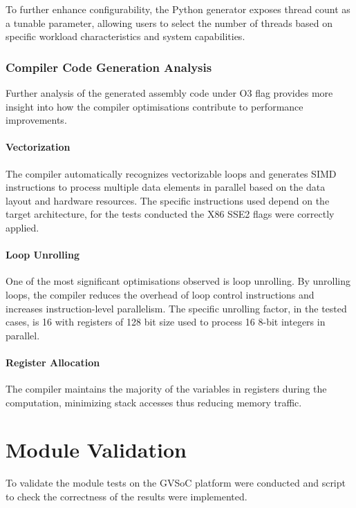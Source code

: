 To further enhance configurability, the Python generator exposes thread count as a tunable parameter, 
allowing users to select the number of threads based on specific workload characteristics and system capabilities.

\subsubsection{Compiler Code Generation Analysis}\label{sec:codegen_analysis}

Further analysis of the generated assembly code under O3 flag provides more insight into how the compiler optimisations contribute to performance improvements.

\paragraph{Vectorization} The compiler automatically recognizes vectorizable loops and generates SIMD instructions to process multiple data elements in parallel based on the data layout and hardware resources.
The specific instructions used depend on the target architecture, for the tests conducted the X86 SSE2 flags were correctly applied.

\paragraph{Loop Unrolling} One of the most significant optimisations observed is loop unrolling.
By unrolling loops, the compiler reduces the overhead of loop control instructions and increases instruction-level parallelism.
The specific unrolling factor, in the tested cases, is 16 with registers of 128 bit size used to process 16 8-bit integers in parallel.
\paragraph{Register Allocation} The compiler maintains the majority of the variables in registers during the computation, minimizing stack accesses thus reducing memory traffic.


\section{Module Validation}\label{sec:mod_val}
To validate the module tests on the GVSoC platform were conducted and script to check the correctness of the results were implemented.
